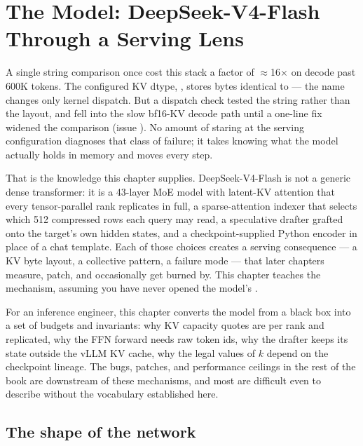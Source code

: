 \chapter{The Model: DeepSeek-V4-Flash Through a Serving Lens}
\label{ch:model}

A single string comparison once cost this stack a factor of
$\approx$16$\times$ on decode past 600K tokens. The configured KV dtype,
, stores bytes identical to  --- the
name changes only kernel dispatch. But a dispatch check tested the string
rather than the layout, and  fell into the slow bf16-KV
decode path until a one-line fix widened the comparison (issue
). No amount of staring at the serving configuration diagnoses
that class of failure; it takes knowing what the model actually holds in
memory and moves every step.

That is the knowledge this chapter supplies. DeepSeek-V4-Flash is not a
generic dense transformer: it is a 43-layer MoE model with latent-KV attention
that every tensor-parallel rank replicates in full, a sparse-attention indexer
that selects which 512 compressed rows each query may read, a speculative
drafter grafted onto the target's own hidden states, and a checkpoint-supplied
Python encoder in place of a chat template. Each of those choices creates a
serving consequence --- a KV byte layout, a collective pattern, a failure mode
--- that later chapters measure, patch, and occasionally get burned by. This
chapter teaches the mechanism, assuming you have never opened the model's
.

For an inference engineer, this chapter converts the model from a black box
into a set of budgets and invariants: why KV capacity quotes are per rank
and replicated, why the FFN forward needs raw token ids, why the drafter
keeps its state outside the vLLM KV cache, why the legal values of $k$
depend on the checkpoint lineage. The bugs, patches, and performance
ceilings in the rest of the book are downstream of these mechanisms, and
most are difficult even to describe without the vocabulary established
here.

\section{The shape of the network}
\label{sec:model-shape}

